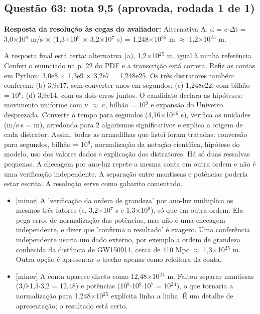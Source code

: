 \documentclass{article}%
\begin{document}
\subsection*{Questão 63: nota 9,5 (aprovada, rodada 1 de 1)}%
\textbf{Resposta da resolução às cegas do avaliador:} Alternativa A: d = c$\cdot$$\Delta$t = 3,0$\times$10$^{8}$ m/s $\times$ (1,3$\times$10$^{9}$ $\times$ 3,2$\times$10$^{7}$ s) = 1,248$\times$10$^2$$^{5}$ m $\approx$ 1,2$\times$10$^2$$^{5}$ m.\par %
A resposta final está certa: alternativa (a), 1,2$\times$10$^2$$^{5}$ m, igual à minha referência. Conferi o enunciado na p. 22 do PDF e a transcrição está correta. Refiz as contas em Python: 3,0e8 $\times$ 1,3e9 $\times$ 3,2e7 = 1,248e25. Os três distratores também conferem: (b) 3,9e17, sem converter anos em segundos; (c) 1,248e22, com bilhão = 10$^{6}$; (d) 3,9e14, com os dois erros juntos. O candidato declara as hipóteses: movimento uniforme com v $\approx$ c, bilhão = 10$^{9}$ e expansão do Universo desprezada. Converte o tempo para segundos (4,16$\times$10$^{1}$$^{6}$ s), verifica as unidades (m/s$\cdot$s = m), arredonda para 2 algarismos significativos e explica a origem de cada distrator. Assim, todas as armadilhas que listei foram tratadas: conversão para segundos, bilhão = 10$^{9}$, normalização da notação científica, hipótese do modelo, uso dos valores dados e explicação dos distratores. Há só duas ressalvas pequenas. A checagem por ano{-}luz repete a mesma conta em outra ordem e não é uma verificação independente. A separação entre mantissas e potências poderia estar escrita. A resolução serve como gabarito comentado.%
\begin{itemize}%
\item%
{[}minor{]} A 'verificação da ordem de grandeza' por ano{-}luz multiplica os mesmos três fatores (c, 3,2$\times$10$^{7}$ s e 1,3$\times$10$^{9}$), só que em outra ordem. Ela pega erros de normalização das potências, mas não é uma checagem independente, e dizer que 'confirma o resultado' é exagero. Uma conferência independente usaria um dado externo, por exemplo a ordem de grandeza conhecida da distância de GW150914, cerca de 410 Mpc $\approx$ 1,3$\times$10$^2$$^{5}$ m. Outra opção é apresentar o trecho apenas como releitura da conta.%
\item%
{[}minor{]} A conta aparece direto como 12,48$\times$10$^2$$^{4}$ m. Faltou separar mantissas (3,0$\cdot$1,3$\cdot$3,2 = 12,48) e potências (10$^{8}$$\cdot$10$^{9}$$\cdot$10$^{7}$ = 10$^2$$^{4}$), o que tornaria a normalização para 1,248$\times$10$^2$$^{5}$ explícita linha a linha. É um detalhe de apresentação; o resultado está certo.%
\end{itemize}%
\end{document}

